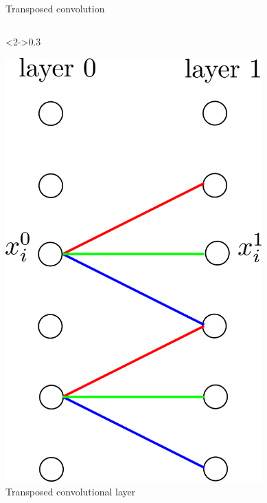 \documentclass[xcolor=pdftex,dvipsnames,table,mathserif]{beamer}
\begin{document}
\begin{frame}{Transposed convolution}
\begin{columns}
    \begin{column}<2->{0.3\textwidth}
      \begin{center}
        \includegraphics[width=0.74\textwidth]{transposed_conv.png}
        \\ \scriptsize{Transposed convolutional layer}
      \end{center}
    \end{column}


\end{columns}
\end{frame}
\end{document}
